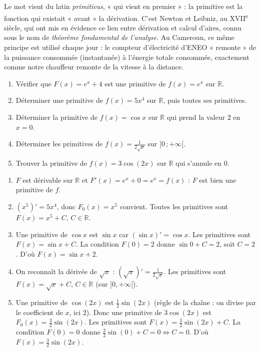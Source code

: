 \documentclass[11pt]{article}
\begin{document}
\begin{savaistu}
Le mot vient du latin \emph{primitivus}, « qui vient en premier » : la primitive est la fonction qui existait « avant » la dérivation. C'est Newton et Leibniz, au XVII\textsuperscript{e} siècle, qui ont mis en évidence ce lien entre dérivation et calcul d'aires, connu sous le nom de \emph{théorème fondamental de l'analyse}. Au Cameroun, ce même principe est utilisé chaque jour : le compteur d'électricité d'ENEO « remonte » de la puissance consommée (instantanée) à l'énergie totale consommée, exactement comme notre chauffeur remonte de la vitesse à la distance.
\end{savaistu}

\begin{exercice}
\begin{enumerate}
\item Vérifier que $F(x)=e^x+4$ est une primitive de $f(x)=e^x$ sur $\mathbb{R}$.
\item Déterminer une primitive de $f(x)=5x^4$ sur $\mathbb{R}$, puis toutes ses primitives.
\item Déterminer la primitive de $f(x)=\cos x$ sur $\mathbb{R}$ qui prend la valeur $2$ en $x=0$.
\item Déterminer les primitives de $f(x)=\frac{1}{2\sqrt{x}}$ sur $]0\,;+\infty[$.
\item Trouver la primitive de $f(x)=3\cos(2x)$ sur $\mathbb{R}$ qui s'annule en $0$.
\end{enumerate}
\end{exercice}

\begin{corrige}
\begin{enumerate}
\item $F$ est dérivable sur $\mathbb{R}$ et $F'(x)=e^x+0=e^x=f(x)$ : $F$ est bien une primitive de $f$.
\item $(x^5)'=5x^4$, donc $F_0(x)=x^5$ convient. Toutes les primitives sont $F(x)=x^5+C$, $C\in\mathbb{R}$.
\item Une primitive de $\cos x$ est $\sin x$ car $(\sin x)'=\cos x$. Les primitives sont $F(x)=\sin x + C$. La condition $F(0)=2$ donne $\sin 0 + C = 2$, soit $C=2$. D'où $F(x)=\sin x + 2$.
\item On reconnaît la dérivée de $\sqrt{x}$ : $(\sqrt{x})' = \frac{1}{2\sqrt{x}}$. Les primitives sont $F(x)=\sqrt{x}+C$, $C\in\mathbb{R}$ (sur $]0,+\infty[$).
\item Une primitive de $\cos(2x)$ est $\frac{1}{2}\sin(2x)$ (règle de la chaîne : on divise par le coefficient de $x$, ici $2$). Donc une primitive de $3\cos(2x)$ est $F_0(x)=\frac{3}{2}\sin(2x)$. Les primitives sont $F(x)=\frac{3}{2}\sin(2x)+C$. La condition $F(0)=0$ donne $\frac{3}{2}\sin(0)+C=0 \iff C=0$. D'où $F(x)=\frac{3}{2}\sin(2x)$.
\end{enumerate}
\end{corrige}
\end{document}
